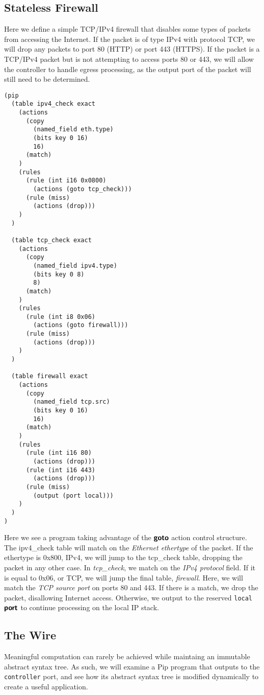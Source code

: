\subsection{Stateless Firewall}
Here we define a simple TCP/IPv4 firewall that disables some types of packets from accessing the Internet. If the packet is of type IPv4 with protocol TCP, we will drop any packets to port 80 (HTTP) or port 443 (HTTPS). If the packet is a TCP/IPv4 packet but is not attempting to access ports 80 or 443, we will allow the controller to handle egress processing, as the output port of the packet will still need to be determined.
\begin{mdframed}
\begin{verbatim}
(pip
  (table ipv4_check exact
    (actions
      (copy 
        (named_field eth.type)
        (bits key 0 16)
        16)
      (match)
    )
    (rules
      (rule (int i16 0x0800)
        (actions (goto tcp_check)))
      (rule (miss)
        (actions (drop)))
    )
  )

  (table tcp_check exact
    (actions
      (copy 
        (named_field ipv4.type)
        (bits key 0 8)
        8)
      (match)
    )
    (rules
      (rule (int i8 0x06)
        (actions (goto firewall)))
      (rule (miss)
        (actions (drop)))
    )
  )

  (table firewall exact
    (actions
      (copy
        (named_field tcp.src)
        (bits key 0 16)
        16)
      (match)
    )
    (rules
      (rule (int i16 80)
        (actions (drop)))
      (rule (int i16 443)
        (actions (drop)))
      (rule (miss)
        (output (port local)))
    )
  )
)
\end{verbatim}
\end{mdframed}

Here we see a program taking advantage of the $\bm{\mathsf{{goto}}}$ action control structure. The ipv4\_check table will match on the \textit{Ethernet ethertype} of the packet. If the ethertype is 0x800, IPv4, we will jump to the tcp\_check table, dropping the packet in any other case. In \textit{tcp\_check}, we match on the \textit{IPv4 protocol} field. If it is equal to 0x06, or TCP, we will jump the final table, \textit{firewall}. Here, we will match the \textit{TCP source port} on ports 80 and 443. If there is a match, we drop the packet, disallowing Internet access. Otherwise, we output to the reserved \texttt{local} $\bm{\mathsf{{port}}}$ to continue processing on the local IP stack.

\subsection{The Wire}
Meaningful computation can rarely be achieved while maintaing an immutable abstract syntax tree. As such, we will examine a Pip program that outputs to the \texttt{controller} port, and see how its abstract syntax tree is modified dynamically to create a useful application.

